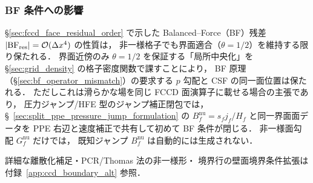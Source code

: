 \subsubsection{BF 条件への影響}
\label{sec:fccd_nu_bf_impact}

\S\ref{sec:fccd_face_residual_order} で示した Balanced--Force（BF）残差 $|\mathrm{BF}_\text{res}| = \mathcal{O}(\Delta x^4)$ の性質は，
非一様格子でも界面適合（$\theta=1/2$）を維持する限り保たれる．
界面近傍のみ $\theta=1/2$ を保証する「局所中央化」を
\S\ref{sec:grid_density} の格子密度関数で課すことにより，
BF 原理（\S\ref{sec:bf_operator_mismatch}）の要求する
$p$ 勾配と CSF の同一面位置は保たれる．
ただしこれは滑らかな場を同じ FCCD 面演算子に載せる場合の主張であり，
圧力ジャンプ/HFE 型のジャンプ補正閉包では，§~\ref{sec:split_ppe_pressure_jump_formulation} の
$B_f^{\mathrm{nu}}=s_fj_f/H_f$ と同一界面面データを PPE 右辺と速度補正で共有して初めて
BF 条件が閉じる．
非一様面勾配 $G_f^{\mathrm{nu}}$ だけでは，
既知ジャンプ $B_f^{\mathrm{nu}}$ は自動的には生成されない．

\noindent 詳細な離散化補足・PCR/Thomas 法の非一様形・
境界行の壁面境界条件拡張は付録~\ref{app:ccd_boundary_alt} 参照．

